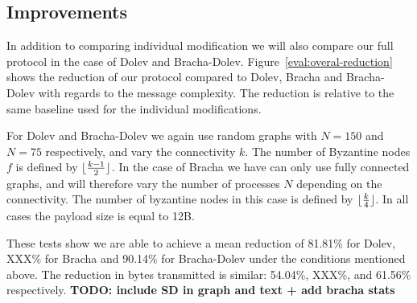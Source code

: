 
\subsection{Improvements}
In addition to comparing individual modification we will also compare our full protocol in the case of Dolev and Bracha-Dolev. Figure~\ref{eval:overal-reduction} shows the reduction of our protocol compared to Dolev, Bracha and Bracha-Dolev with regards to the message complexity. The reduction is relative to the same baseline used for the individual modifications.

For Dolev and Bracha-Dolev we again use random graphs with $N=150$ and $N=75$ respectively, and vary the connectivity $k$. The number of Byzantine nodes $f$ is defined by $\lfloor\frac{k-1}{2}\rfloor$. In the case of Bracha we have can only use fully connected graphs, and will therefore vary the number of processes $N$ depending on the connectivity. The number of byzantine nodes in this case is defined by $\lfloor\frac{k}{4}\rfloor$. In all cases the payload size is equal to 12B. 

These tests show we are able to achieve a mean reduction of 81.81\% for Dolev, XXX\% for Bracha and 90.14\% for Bracha-Dolev under the conditions mentioned above. The reduction in bytes transmitted is similar: 54.04\%, XXX\%, and 61.56\% respectively. \textbf{TODO: include SD in graph and text + add bracha stats}

